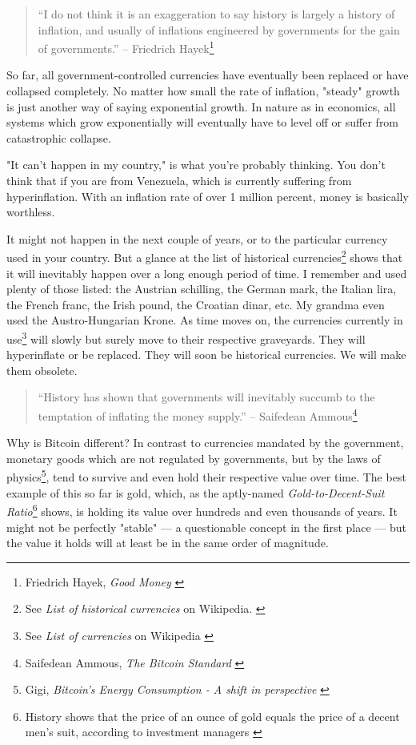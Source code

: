 \begin{quotation}
``I do not think it is an exaggeration to say history is largely a
history of inflation, and usually of inflations engineered by
governments for the gain of governments.''
\flushright -- Friedrich Hayek\footnote{Friedrich Hayek, \textit{Good Money} \cite{hayek-good-money}}
\end{quotation}

So far, all government-controlled currencies have eventually been
replaced or have collapsed completely. No matter how small the rate of
inflation, "steady" growth is just another way of saying exponential
growth. In nature as in economics, all systems which grow exponentially
will eventually have to level off or suffer from catastrophic collapse.

"It can't happen in my country," is what you're probably thinking. You don't
think that if you are from Venezuela, which is currently suffering from
hyperinflation. With an inflation rate of over 1 million percent, money is
basically worthless. \cite{wiki:venezuela}

It might not happen in the next couple of years, or to the particular currency
used in your country. But a glance at the list of historical
currencies\footnote{See \textit{List of historical currencies} on Wikipedia.
\cite{wiki:historical-currencies}} shows that it will inevitably happen over a
long enough period of time. I remember and used plenty of those listed: the
Austrian schilling, the German mark, the Italian lira, the French franc, the
Irish pound, the Croatian dinar, etc. My grandma even used the Austro-Hungarian
Krone. As time moves on, the currencies currently in use\footnote{See
\textit{List of currencies} on Wikipedia \cite{wiki:list-of-currencies}} will
slowly but surely move to their respective graveyards. They will hyperinflate or
be replaced. They will soon be historical currencies. We will make them
obsolete.

\begin{quotation}
``History has shown that governments will inevitably succumb to the
temptation of inflating the money supply.''
\flushright -- Saifedean Ammous\footnote{Saifedean Ammous, \textit{The Bitcoin
Standard} \cite{bitcoin-standard}}
\end{quotation}

Why is Bitcoin different? In contrast to currencies mandated by the government,
monetary goods which are not regulated by governments, but by the laws of
physics\footnote{Gigi, \textit{Bitcoin's Energy Consumption - A shift in
perspective} \cite{gigi:energy}}, tend to survive and even hold their respective
value over time. The best example of this so far is gold, which, as the
aptly-named \textit{Gold-to-Decent-Suit Ratio}\footnote{History shows that the
price of an ounce of gold equals the price of a decent men's suit, according to
investment managers \cite{web:gold-to-decent-suite-ratio}} shows, is holding its
value over hundreds and even thousands of years. It might not be perfectly
"stable" --- a questionable concept in the first place --- but the value it
holds will at least be in the same order of magnitude.


